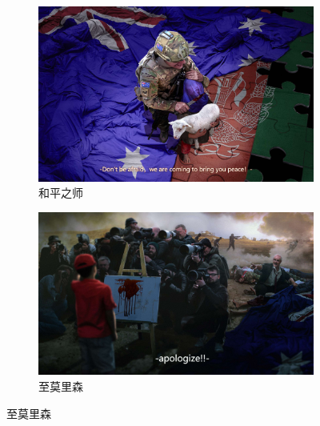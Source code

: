 \documentclass[zihao = -4, linespread = 1.5]{ctexart} %
\begin{document}
\begin{figure}[htbp]
     \centering
     \begin{subfigure}[b]{.5\linewidth - 1mm}
         \centering
         \includegraphics[width=\textwidth,trim=0 12 0 12,clip]{picture/和平之师.jpg} %
         \caption{和平之师}
         \label{fig:HePingZhiShi}
     \end{subfigure}
     \hfill
     \begin{subfigure}[b]{.5\linewidth - 1mm}
         \centering
         \includegraphics[width=\textwidth]{picture/至莫里森.jpg}
         \caption{至莫里森}
         \label{fig:ZhiMoLiSen}
     \end{subfigure}


\end{figure}
\end{document}

